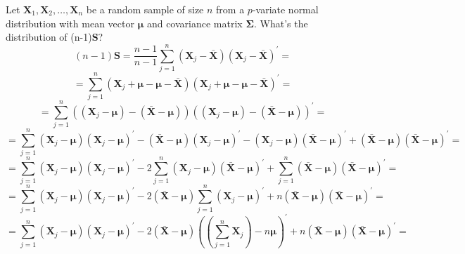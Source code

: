 \documentclass{article}
\begin{document}
Let $\textbf{X}_{1}, \textbf{X}_{2}, \dots, \textbf{X}_{n}$ be a random sample of size $n$ from a $p$-variate normal distribution with mean vector $\bm{\mu}$ and covariance matrix $\bm{\Sigma}$. What's the distribution of (n-1)\textbf{S}?
    \[
        (n-1)\textbf{S}
        =
        \frac{n-1}{n -1}
        \sum_{j=1}^{n}{
            \left(\textbf{X}_{j} - \bar{\textbf{X}}\right)
            {\left(\textbf{X}_{j} - \bar{\textbf{X}}\right)}^{\prime}
        }
        =
    \]
    \[
        =
        \sum_{j=1}^{n}{
            \left(\textbf{X}_{j} + \bm{\mu} - \bm{\mu} - \bar{\textbf{X}}\right)
            {\left(\textbf{X}_{j} + \bm{\mu} - \bm{\mu} - \bar{\textbf{X}}\right)}^{\prime}
        }
        =
    \]
    \[
        =
        \sum_{j=1}^{n}{
            \left((\textbf{X}_{j} - \bm{\mu}) - (\bar{\textbf{X}} - \bm{\mu})\right)
            {\left((\textbf{X}_{j} - \bm{\mu}) - (\bar{\textbf{X}} - \bm{\mu})\right)}^{\prime}
        }
        =
    \]
    \[
        =
        \scriptstyle{
        \sum_{j=1}^{n}{
            (\textbf{X}_{j} - \bm{\mu}){(\textbf{X}_{j} - \bm{\mu})}^{\prime}
            -
            (\bar{\textbf{X}} - \bm{\mu}){(\textbf{X}_{j} - \bm{\mu})}^{\prime}
            -
            (\textbf{X}_{j} - \bm{\mu}){(\bar{\textbf{X}} - \bm{\mu})}^{\prime}
            +
            (\bar{\textbf{X}} - \bm{\mu}){(\bar{\textbf{X}} - \bm{\mu})}^{\prime}
        }
        }
        =
    \]
    \[
        =
        \scriptstyle{
        \sum_{j=1}^{n}{
            (\textbf{X}_{j} - \bm{\mu}){(\textbf{X}_{j} - \bm{\mu})}^{\prime}
        }
        -
        2
        \sum_{j=1}^{n}{
            (\textbf{X}_{j} - \bm{\mu}){(\bar{\textbf{X}} - \bm{\mu})}^{\prime}
        }
        +
        \sum_{j=1}^{n}{
            (\bar{\textbf{X}} - \bm{\mu}){(\bar{\textbf{X}} - \bm{\mu})}^{\prime}
        }
        }
        =
    \]
    \[
        =
        \scriptstyle{
        \sum_{j=1}^{n}{
            (\textbf{X}_{j} - \bm{\mu}){(\textbf{X}_{j} - \bm{\mu})}^{\prime}
        }
        -
        2
        (\bar{\textbf{X}} - \bm{\mu})
        \sum_{j=1}^{n}{
            {(\textbf{X}_{j} - \bm{\mu})}^{\prime}
        }
        +
        n
        (\bar{\textbf{X}} - \bm{\mu}){(\bar{\textbf{X}} - \bm{\mu})}^{\prime}
        }
        =
    \]
    \[
        =
        \scriptstyle{
        \sum_{j=1}^{n}{
            (\textbf{X}_{j} - \bm{\mu}){(\textbf{X}_{j} - \bm{\mu})}^{\prime}
        }
        -
        2
        (\bar{\textbf{X}} - \bm{\mu})
        {((\sum_{j=1}^{n}{\textbf{X}_{j}}) - n\bm{\mu})}^{\prime}
        +
        n
        (\bar{\textbf{X}} - \bm{\mu}){(\bar{\textbf{X}} - \bm{\mu})}^{\prime}
        }
        =
    \]
\end{document}
